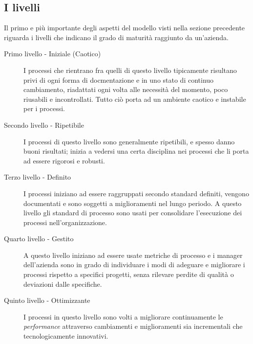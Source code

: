 \subsection{I livelli}
Il primo e più importante degli aspetti del modello visti nella sezione precedente riguarda i livelli che indicano il grado di maturità raggiunto da un'azienda.
\begin{description}
\item[Primo livello - Iniziale (Caotico)] I processi che rientrano fra quelli di questo livello tipicamente risultano privi di ogni forma di docmentazione e in uno stato di continuo cambiamento, riadattati ogni volta alle necessità del momento, poco riusabili e incontrollati. Tutto ciò porta ad un ambiente caotico e instabile per i processi.
\item[Secondo livello - Ripetibile] I processi di questo livello sono generalmente ripetibili, e spesso danno buoni risultati; inizia a vedersi una certa disciplina nei processi che li porta ad essere rigorosi e robusti.
\item[Terzo  livello - Definito] I processi iniziano ad essere raggruppati secondo standard definiti, vengono documentati e sono soggetti a miglioramenti nel lungo periodo. A questo livello gli standard di processo sono usati per consolidare l'esecuzione dei processi nell'organizzazione.
\item[Quarto livello - Gestito] A questo livello iniziano ad essere usate metriche di processo e i manager dell'azienda sono in grado di individuare i modi di adeguare e migliorare i processi rispetto a specifici progetti, senza rilevare perdite di qualità o deviazioni dalle specifiche.
\item[Quinto livello - Ottimizzante] I processi in questo livello sono volti a migliorare continuamente le \textit{performance} attraverso cambiamenti e miglioramenti sia incrementali che tecnologicamente innovativi.
\end{description}

